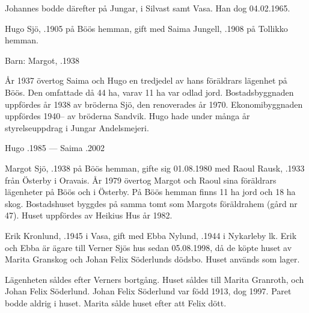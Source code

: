 Johannes bodde därefter på Jungar, i Silvast samt Vasa. Han dog 04.02.1965.






Hugo Sjö, .1905 på Böös hemman, gift med Saima Jungell, .1908 på Tollikko hemman.

Barn: Margot, .1938

År 1937 övertog Saima och Hugo en tredjedel av hans föräldrars lägenhet på Böös. Den omfattade då 44 ha, varav 11 ha var odlad jord. Bostadsbyggnaden uppfördes år 1938 av bröderna Sjö, den renoverades år 1970. Ekonomibyggnaden uppfördes 1940-- av bröderna Sandvik. Hugo hade under många år styrelseuppdrag i Jungar Andelsmejeri.

Hugo .1985  ---  Saima .2002



Margot Sjö, .1938 på Böös hemman, gifte sig 01.08.1980 med Raoul Rausk, .1933 från Österby i Oravais. År 1979 övertog Margot och Raoul sina föräldrars lägenheter på Böös och i Österby. På Böös hemman finns 11 ha jord och 18 ha skog. Bostadshuset byggdes på samma tomt som Margots föräldrahem (gård nr 47). Huset uppfördes av Heikius Hus år 1982.\jhvspace{}






Erik Kronlund, .1945 i Vasa, gift med Ebba Nylund, .1944 i Nykarleby lk. Erik och Ebba är ägare till Verner Sjös hus sedan 05.08.1998, då de köpte huset av Marita Granskog och Johan Felix Söderlunds dödsbo. Huset används som lager.\jhvspace{}


Lägenheten såldes efter Verners bortgång. Huset såldes till Marita Granroth,  och Johan Felix Söderlund. Johan Felix Söderlund var född 1913, dog 1997. Paret bodde aldrig i huset. Marita sålde huset efter att Felix dött.\jhvspace{}


